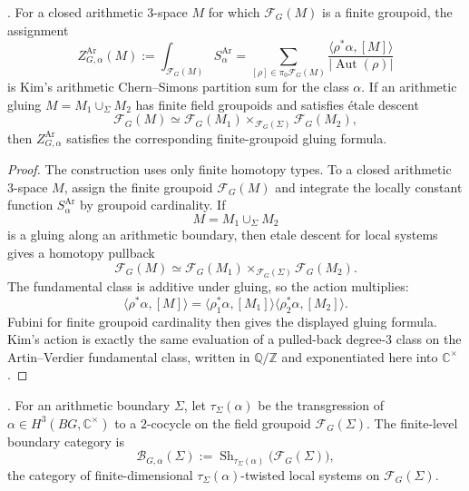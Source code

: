 \begin{theorem}
\label{v4-arith:3d-acs:thm:finite-level-ACS}
\ClaimStatusProvedHere. For a closed arithmetic \(3\)-space \(M\) for
which \(\mathcal F_G(M)\) is a finite groupoid, the assignment
\[
Z^{\mathrm{Ar}}_{G,\alpha}(M)
:=\int_{\mathcal F_{G}(M)}S_{\alpha}^{\mathrm{Ar}}
=\sum_{[\rho]\in\pi_{0}\mathcal F_{G}(M)}
\frac{\langle\rho^{*}\alpha,[M]\rangle}{|\operatorname{Aut}(\rho)|}
\]
is Kim's arithmetic Chern--Simons partition sum for the class
\(\alpha\). If an arithmetic gluing \(M=M_{1}\cup_{\Sigma}M_{2}\)
has finite field groupoids and satisfies étale descent
\[
\mathcal F_G(M)\simeq
\mathcal F_G(M_1)\times_{\mathcal F_G(\Sigma)}\mathcal F_G(M_2),
\]
then \(Z^{\mathrm{Ar}}_{G,\alpha}\) satisfies the corresponding
finite-groupoid gluing formula.
\end{theorem}

\begin{proof}
The construction uses only finite homotopy types. To a closed
arithmetic 3-space \(M\), assign the finite groupoid
\(\mathcal F_{G}(M)\) and integrate the locally constant function
\(S_{\alpha}^{\mathrm{Ar}}\) by groupoid cardinality. If
\[
M=M_{1}\cup_{\Sigma}M_{2}
\]
is a gluing along an arithmetic boundary, then etale descent for
local systems gives a homotopy pullback
\[
\mathcal F_{G}(M)\simeq
\mathcal F_{G}(M_{1})\times_{\mathcal F_{G}(\Sigma)}
\mathcal F_{G}(M_{2}).
\]
The fundamental class is additive under gluing, so the action
multiplies:
\[
\langle\rho^{*}\alpha,[M]\rangle
=
\langle\rho_{1}^{*}\alpha,[M_{1}]\rangle
\langle\rho_{2}^{*}\alpha,[M_{2}]\rangle .
\]
Fubini for finite groupoid cardinality then gives the displayed gluing
formula. Kim's action is exactly the same evaluation of a pulled-back
degree-3 class on the Artin--Verdier fundamental class, written in
\(\mathbb Q/\mathbb Z\) and exponentiated here into
\(\mathbb C^{\times}\).
\end{proof}

\begin{definition}
\label{v4-arith:3d-acs:def:finite-boundary-category}
\ClaimStatusDefinitional. For an arithmetic boundary \(\Sigma\), let
\(\tau_{\Sigma}(\alpha)\) be the transgression of
\(\alpha\in H^{3}(BG,\mathbb C^{\times})\) to a \(2\)-cocycle on the
field groupoid \(\mathcal F_{G}(\Sigma)\). The finite-level boundary
category is
\[
\mathcal B_{G,\alpha}(\Sigma):=
\operatorname{Sh}_{\tau_{\Sigma}(\alpha)}
\bigl(\mathcal F_{G}(\Sigma)\bigr),
\]
the category of finite-dimensional \(\tau_{\Sigma}(\alpha)\)-twisted
local systems on \(\mathcal F_{G}(\Sigma)\).
\end{definition}

